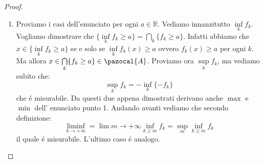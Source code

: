 \documentclass[11pt,a4paper]{report}
\theoremstyle{plain}
\theoremstyle{definition}
\newcommand{\A}{\pazocal{A}}
\begin{document}
\begin{proof}
\begin{enumerate}
\begin{itemize}
				\item[$"gener."$] Qui dobbiamo prendere per buono il punto 2 del teorema e definiamo:
				\[
					f_k = (f \wedge k) \vee (-k)				
				\]
				\[
					g_k = (g \wedge k) \vee (-k)				
				\]
				dove con $k$ indichiamo (e.g. la retta del piano) $y = k$. Per il punto 2 entrambe queste funzioni sono misurabili  quindi anche $f_k\cdot g_k$ lo \'e. Ora sparando $k \rightarrow +\infty$ otteniamo che anche $g\cdot f$ \'e misurabile.
			\end{itemize}
			Analizziamo ora $|f|$ dove scriviamo $|f| = \alpha \circ f$ con $\alpha(t) = |t|$. Sappiamo che $\alpha$ \'e una funzione continua su $\overline{\mathbb{R}}$ quindi come sopra $\alpha \circ f$ \'e misurabile e di conseguenza anche $|f|$ lo \'e.
			Vediamo ora per $\frac{f}{g}$. Ci basta provare che $\frac{1}{g}$ \'e misurabile e la tesi segue facilmente applicando il prodotto. Vogliamo mostrare che $\{g < a\} \in \A\ \forall a \in \mathbb{R}$.
			\begin{itemize}
				\item[$a=0$] allora $\{\frac{1}{g} < a\} = \{\frac{1}{g} < 0\} = \{ g < 0\} \in \A$
				\item[$a < 0$] allora $\{\frac{1}{g} < a\}$ ma $\frac{1}{g(x)} < a$ se e solo se:
				\[
					\begin{cases}
						g(x) < 0 \\
						g(x) > \frac{1}{a}
					\end{cases}				
				\]
				ovvero se e solo se $\frac{1}{a} < g(x) < 0$. Perci\'o $\{\frac{1}{g} < a\} = {g < 0} \cap {g > \frac{1}{a}}$ il quale \'e un insieme misurabile, quindi ok.
				\item[$a > 0$] Stesso ragionamento di sopra.
			\end{itemize}
			\item Proviamo i casi dell'enunciato per ogni $a \in \mathbb{R}$.
			Vediamo innanzitutto $\inf\limits_kf_k$. Vogliamo dimostrare che $\{\inf\limits_kf_k \ge a\} = \bigcap\limits_k\{f_k \ge a\}$. Infatti abbiamo che $x \in \{\inf\limits_k f_k \ge a\}$ se e solo se $\inf\limits_k f_k(x) \ge a$ ovvero $f_k(x) \ge a$ per ogni $k$. Ma allora $x \in \bigcap\limits_k\{f_k \ge a\} \in \A$.
			Proviamo ora $\sup\limits_kf_k$, ma vediamo subito che:
				\[
					\sup\limits_kf_k = -\inf\limits_k\{-f_k\}				
				\]
				che \'e misurabile.
				Da questi due appena dimostrati derivano anche $\max$ e $\min$ dell' enunciato punto 1.
				Andando avanti vediamo che secondo definizione:
				\[ \liminf\limits_{k \rightarrow +\infty} = \lim\limits{m \rightarrow +\infty}\inf\limits_{k \ge m}f_k = \sup\limits_{m}\inf\limits_{k \ge m}f_k
				\]
				il quale \'e misurabile.
				L'ultimo caso \'e analogo.
	\end{enumerate}
\end{proof}
\end{document}
